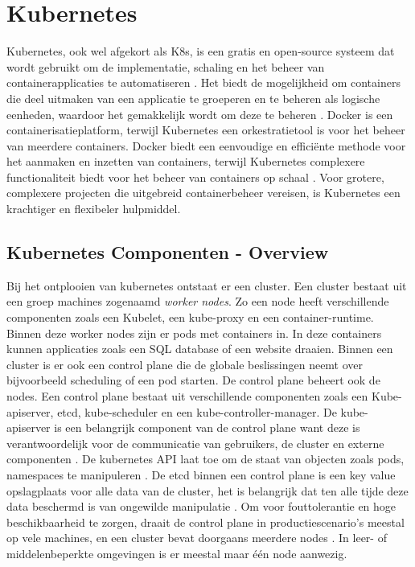 \section{Kubernetes}
Kubernetes, ook wel afgekort als K8s, is een gratis en open-source systeem dat wordt gebruikt om de implementatie, schaling en het beheer van containerapplicaties te automatiseren \autocite{KubernetesDocs-2023}. 
Het biedt de mogelijkheid om containers die deel uitmaken van een applicatie te groeperen en te beheren als logische eenheden, waardoor het gemakkelijk wordt om deze te beheren \autocite{KubernetesDocs-2023}.
Docker is een containerisatieplatform, terwijl Kubernetes een orkestratietool is voor het beheer van meerdere containers.
Docker biedt een eenvoudige en efficiënte methode voor het aanmaken en inzetten van containers, terwijl Kubernetes complexere functionaliteit biedt voor het beheer van containers op schaal \autocite{banerjee-2023}.
Voor grotere, complexere projecten die uitgebreid containerbeheer vereisen, is Kubernetes een krachtiger en flexibeler hulpmiddel.

\subsection{Kubernetes Componenten - Overview}
\autocite{KubernetesDocs-2023} Bij het ontplooien van kubernetes ontstaat er een cluster. Een cluster bestaat uit een groep machines zogenaamd \textit{worker nodes}. Zo een node heeft verschillende componenten zoals een Kubelet, een kube-proxy en een container-runtime.
Binnen deze worker nodes zijn er pods met containers in. In deze containers kunnen applicaties zoals een SQL database of een website draaien. 
\autocite{KubernetesDocs-2023} Binnen een cluster is er ook een control plane die de globale beslissingen neemt over bijvoorbeeld scheduling of een pod starten. De control plane beheert ook de nodes. 
\autocite{KubernetesDocs-2023} Een control plane bestaat uit verschillende componenten zoals een Kube-apiserver, etcd, kube-scheduler en een kube-controller-manager. 
De kube-apiserver is een belangrijk component van de control plane want deze is verantwoordelijk voor de communicatie van gebruikers, de cluster en externe componenten \autocite{hohn-2020}. 
De kubernetes API laat toe om de staat van objecten zoals pods, namespaces te manipuleren \autocite{KubernetesDocs-2023}.
De etcd binnen een control plane is een key value opslagplaats voor alle data van de cluster, het is belangrijk dat ten alle tijde deze data beschermd is van ongewilde manipulatie \autocite{KubernetesDocs-2023}. 
Om voor fouttolerantie en hoge beschikbaarheid te zorgen, draait de control plane in productiescenario's meestal op vele machines, en een cluster bevat doorgaans meerdere nodes \autocite{KubernetesDocs-2023}. 
In leer- of middelenbeperkte omgevingen is er meestal maar één node aanwezig.

